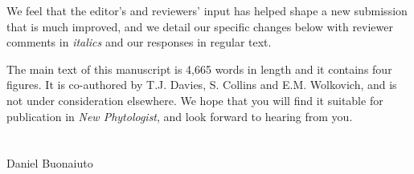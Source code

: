 \documentclass{article}[12pt]
\begin{document}
We feel that the editor’s and reviewers’ input has helped shape a new submission that is much improved, and we detail our specific changes below with reviewer comments in \emph{italics} and our responses in regular text.

The main text of this manuscript is 4,665 words in length and it contains four figures. It is co-authored
by T.J. Davies, S. Collins and E.M. Wolkovich, and is not under consideration elsewhere. We hope that you will find it suitable for publication in \emph{New Phytologist}, and look forward to hearing from you.\\\\\\

\noindent Daniel Buonaiuto\\
\pagebreak
 
\end{document}
